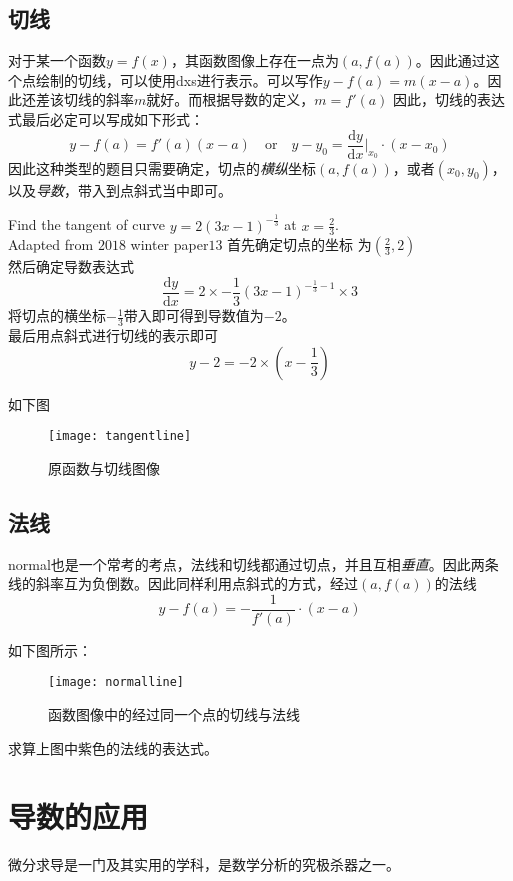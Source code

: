 \subsection*{切线}
对于某一个函数$y=f(x)$，其函数图像上存在一点为$(a,f(a))$。因此通过这个点绘制的切线，可以使用\gls{dxs}进行表示。可以写作$y-f(a)=m(x-a)$。因此还差该切线的斜率$m$就好。而根据导数的定义，$m=f'(a)$
因此，切线的表达式最后必定可以写成如下形式：
\[
	y-f(a)=f'(a) (x-a) \quad \text{or}\quad y-y_0=\frac{\mathrm{d} y}{\mathrm{d} x}\bigg |_{x_0} \cdot  (x-x_0)
\]
因此这种类型的题目只需要确定，切点的\emph{横纵}坐标$(a,f(a))$，或者$(x_0,y_0)$，以及\emph{导数}，带入到点斜式当中即可。

\begin{ExampleBox}
Find the tangent of curve $y=2(3x-1)^{-\frac{1}{3}}$ at $x=\frac{2}{3}$.\\
\mbox{}\hfill Adapted from $2018$ winter paper$13$
\tcblower
首先确定切点的坐标 为$\left(\frac{2}{3},2\right)$\\
然后确定导数表达式
\[
	\frac{\mathrm{d} y}{\mathrm{d} x}=2\times -\frac{1}{3}(3x-1)^{-\frac{1}{3}-1}\times 3
\]
将切点的横坐标$-\frac{1}{3}$带入即可得到导数值为$-2$。\\
最后用点斜式进行切线的表示即可
\[
	y-2=-2 \times \left(x-\frac{1}{3}\right)
\]

如下图
\begin{figure}[H]
\centering
\texttt{[image: tangentline]}
\caption{原函数与切线图像}
\end{figure}
\end{ExampleBox}


\subsection*{法线}
\gls{normal}也是一个常考的考点，法线和切线都通过切点，并且互相\emph{垂直}。因此两条线的斜率互为负倒数。因此同样利用点斜式的方式，经过$(a, f(a))$的法线
\[
	y-f(a)=-\frac{1}{f'(a)}\cdot (x-a)
\]

如下图所示：
\begin{figure}[H]
\centering
\texttt{[image: normalline]}
\caption{函数图像中的经过同一个点的切线与法线}
\end{figure}

\begin{TaskBox}
求算上图中紫色的法线的表达式。
\end{TaskBox}
\clearpage


\section{导数的应用}
\label{sec:Application of derivative}
微分求导是一门及其实用的学科，是数学分析的究极杀器之一。

